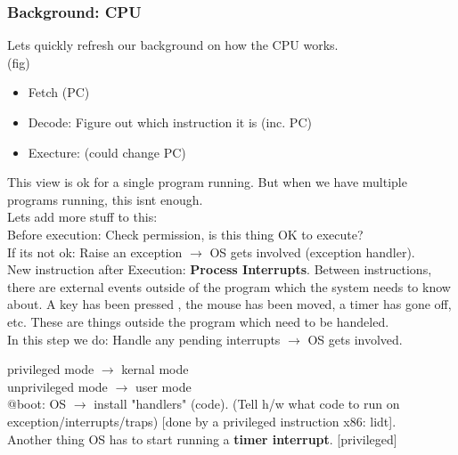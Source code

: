 \subsubsection{Background: CPU}

Lets quickly refresh our background on how the CPU works.\\

(fig)\\

\begin{itemize}
    \item Fetch (PC)
    \item Decode: Figure out which instruction it is (inc. PC)
    \item Execture: (could change PC)
\end{itemize}

This view is ok for a single program running. But when we have
multiple programs running, this isnt enough.\\

Lets add more stuff to this:\\

Before execution: Check permission, is this thing OK to execute?\\

If its not ok: Raise an exception $\rightarrow$ OS gets involved 
(exception handler).\\

New instruction after Execution: \textbf{Process Interrupts}. 
Between instructions, there are external events outside of the
program which the system needs to know about. A key has been pressed
, the mouse has been moved, a timer has gone off, etc. These are
things outside the program which need to be handeled.\\

In this step we do: Handle any pending interrupts $\rightarrow$ 
OS gets involved.

privileged mode $\rightarrow$ kernal mode\\
unprivileged mode $\rightarrow$ user mode\\

@boot: OS $\rightarrow$ install "handlers" (code). (Tell h/w what
code to run on exception/interrupts/traps) [done by a privileged
instruction x86: lidt].\\

Another thing OS has to start running a \textbf{timer interrupt}.
[privileged]\\

